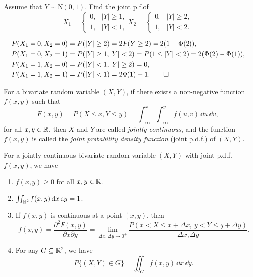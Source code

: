 \begin{example}
  Assume that \(Y \sim \mathrm{N}(0, 1)\). Find the joint p.f.\@ of
  \[
    X_1 = \begin{cases}
      0, & |Y| \geq 1, \\
      1, & |Y| < 1,
    \end{cases}
    X_2 = \begin{cases}
      0, & |Y| \geq 2, \\
      1, & |Y| < 2.
    \end{cases}
  \]
\end{example}
\begin{solution}
  \begin{align*}
    P(X_1 = 0, X_2 = 0) &= P(|Y| \geq 2) = 2P(Y \geq 2) = 2(1 - \Phi(2)), \\
    P(X_1 = 0, X_2 = 1) &= P(|Y| \geq 1, |Y| < 2) = P(1 \leq |Y| < 2) = 2(\Phi(2) - \Phi(1)), \\
    P(X_1 = 1, X_2 = 0) &= P(|Y| < 1, |Y| \geq 2) = 0, \\
    P(X_1 = 1, X_2 = 1) &= P(|Y| < 1) = 2\Phi(1) - 1. \qedhere
  \end{align*}
\end{solution}

\begin{definition}
  For a bivariate random variable \((X, Y)\), if there exists a non-negative function \(f(x, y)\) such that
  \[
    F(x, y) = P(X \leq x, Y \leq y) = \int_{-\infty}^x \int_{-\infty}^y f(u, v) \, \dd u \, \dd v,
  \]
  for all \(x, y \in \mathbb{R}\), then \(X\) and \(Y\) are called \emph{jointly continuous}, and the function \(f(x, y)\) is called the \emph{joint probability density function} (joint p.d.f.\@) of \((X, Y)\).
\end{definition}

\begin{proposition}
  For a jointly continuous bivariate random variable \((X, Y)\) with joint p.d.f.\@ \(f(x, y)\), we have
  \begin{enumerate}
    \item \(f(x, y) \geq 0\) for all \(x, y \in \mathbb{R}\).
    \item \(\iint_{\mathbb{R}^2} f(x, y) \, \mathrm{d} x \, \mathrm{d} y = 1\).
    \item If \(f(x, y)\) is continuous at a point \((x, y)\), then
    \[
      f(x, y) = \frac{\partial^2 F(x, y)}{\partial x \partial y} = \lim_{\Delta x,\Delta y\to0^+}\frac{P(x<X\le x+\Delta x,\ y<Y\le y+\Delta y)}{\Delta x,\Delta y}.
    \]
    \item For any \(G \subseteq \mathbb{R}^2\), we have
    \[
      P\{(X, Y) \in G\} = \iint_G f(x, y) \, \dd x \, \dd y.
    \]
  \end{enumerate}
\end{proposition}

